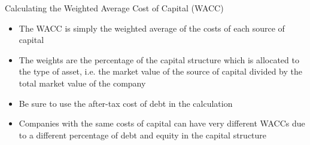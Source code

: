 \documentclass[]{article}
\begin{document}
\begin{section}{Calculating the Weighted Average Cost of Capital (WACC)}
\begin{itemize}
\item The WACC is simply the weighted average of the costs of each source of capital
\item The weights are the percentage of the capital structure which is allocated to the type of asset, i.e. the market value of the source of capital divided by the total market value of the company
\item Be sure to use the after-tax cost of debt in the calculation
\item Companies with the same costs of capital can have very different WACCs due to a different percentage of debt and equity in the capital structure
\end{itemize}
\end{section}
\end{document}
